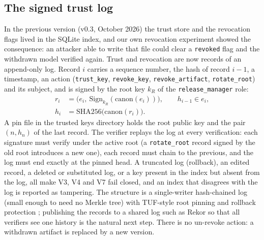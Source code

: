 \documentclass[conference]{IEEEtran}
\begin{document}
\subsection{The signed trust log}
In the previous version (v0.3, October 2026) the trust store and the revocation flags lived in the SQLite index, and our own revocation experiment showed the consequence: an attacker able to write that file could clear a \texttt{revoked} flag and the withdrawn model verified again. Trust and revocation are now records of an append-only log. Record $i$ carries a sequence number, the hash of record $i-1$, a timestamp, an action (\texttt{trust\_key}, \texttt{revoke\_key}, \texttt{revoke\_artifact}, \texttt{rotate\_root}) and its subject, and is signed by the root key $k_R$ of the \texttt{release\_manager} role:
\begin{align}
r_i &= \bigl(e_i,\ \mathrm{Sign}_{k_R}(\mathrm{canon}(e_i))\bigr),\qquad h_{i-1}\in e_i, \label{eq:log}\\
h_i &= \mathrm{SHA256}\bigl(\mathrm{canon}(r_i)\bigr). \nonumber
\end{align}
A pin file in the trusted keys directory holds the root public key and the pair $(n, h_n)$ of the last record. The verifier replays the log at every verification: each signature must verify under the active root (a \texttt{rotate\_root} record signed by the old root introduces a new one), each record must chain to the previous, and the log must end exactly at the pinned head. A truncated log (rollback), an edited record, a deleted or substituted log, or a key present in the index but absent from the log, all make V3, V4 and V7 fail closed, and an index that disagrees with the log is reported as tampering. The structure is a single-writer hash-chained log (small enough to need no Merkle tree) with TUF-style root pinning and rollback protection \cite{tuf2010}; publishing the records to a shared log such as Rekor so that all verifiers see one history is the natural next step. There is no un-revoke action: a withdrawn artifact is replaced by a new version.
\end{document}
